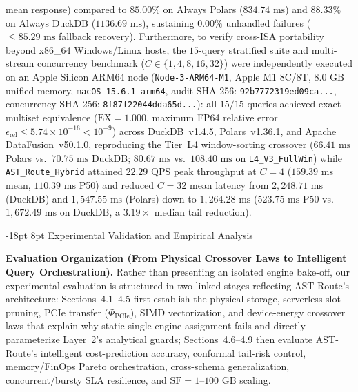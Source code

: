 \documentclass[10pt,a4paper]{article}
\makeatletter
\renewcommand\section{\@startsection{section}{1}{\z@}%
  {-18pt \@plus -4pt \@minus -2pt}%
  {8pt \@plus 2pt}%
  {\normalfont\large\bfseries}}
\makeatother
\begin{document}
mean response) compared to $85.00\%$ on Always Polars ($834.74\text{ ms}$) and $88.33\%$ on Always DuckDB ($1136.69\text{ ms}$), sustaining $0.00\%$ unhandled failures ($\le 85.29\text{ ms}$ fallback recovery). Furthermore, to verify cross-ISA portability beyond x86\_64 Windows/Linux hosts, the $15$-query stratified suite and multi-stream concurrency benchmark ($C \in \{1,4,8,16,32\}$) were independently executed on an Apple Silicon ARM64 node (\texttt{Node-3-ARM64-M1}, Apple M1 $8$C/$8$T, $8.0\text{ GB}$ unified memory, \texttt{macOS-15.6.1-arm64}, audit SHA-256: \texttt{92b7772319ed09ca...}, concurrency SHA-256: \texttt{8f87f22044dda65d...}): all $15/15$ queries achieved exact multiset equivalence ($\text{EX}=1.000$, maximum FP64 relative error $\epsilon_{\text{rel}} \le 5.74 \times 10^{-16} < 10^{-9}$) across DuckDB~v1.4.5, Polars~v1.36.1, and Apache DataFusion~v50.1.0, reproducing the Tier~L4 window-sorting crossover ($66.41\text{ ms}$ Polars vs.\ $70.75\text{ ms}$ DuckDB; $80.67\text{ ms}$ vs.\ $108.40\text{ ms}$ on \texttt{L4\_\allowbreak{}V3\_\allowbreak{}FullWin}) while \texttt{AST\_\allowbreak{}Route\_\allowbreak{}Hybrid} attained $22.29\text{ QPS}$ peak throughput at $C=4$ ($159.39\text{ ms}$ mean, $110.39\text{ ms}$ P50) and reduced $C=32$ mean latency from $2{,}248.71\text{ ms}$ (DuckDB) and $1{,}547.55\text{ ms}$ (Polars) down to $1{,}264.28\text{ ms}$ ($523.75\text{ ms}$ P50 vs.\ $1{,}672.49\text{ ms}$ on DuckDB, a $3.19\times$ median tail reduction).

\section{Experimental Validation and Empirical Analysis}

\par\vspace{7pt plus 2pt minus 1pt}\noindent\textbf{Evaluation Organization (From Physical Crossover Laws to Intelligent Query Orchestration).} Rather than presenting an isolated engine bake-off, our experimental evaluation is structured in two linked stages reflecting AST-Route's architecture: Sections~4.1--4.5 first establish the physical storage, serverless slot-pruning, PCIe transfer ($\Phi_{\text{PCIe}}$), SIMD vectorization, and device-energy crossover laws that explain why static single-engine assignment fails and directly parameterize Layer~2's analytical guards; Sections~4.6--4.9 then evaluate AST-Route's intelligent cost-prediction accuracy, conformal tail-risk control, memory/FinOps Pareto orchestration, cross-schema generalization, concurrent/bursty SLA resilience, and $\text{SF}=1\text{--}100\text{ GB}$ scaling.
\end{document}
